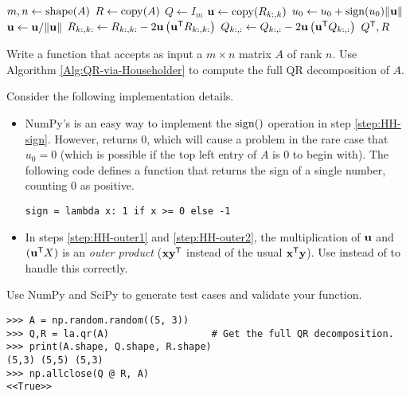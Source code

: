 \begin{algorithm}[H] %
\begin{algorithmic}[1]
    \State $m, n \gets \mathrm{shape}(A)$
    \State $R \gets \mathrm{copy}(A)$
    \State $Q \gets I_{m}$
        \State $\mathbf{u} \gets \mathrm{copy}(R_{k:,k})$
        \State $u_0 \gets u_0 + \operatorname{sign}(u_0)\|\mathbf{u}\|$
            \label{step:HH-sign}
        \State $\mathbf{u} \gets \mathbf{u}/\|\mathbf{u}\|$
        \State $R_{k:,k:} \gets R_{k:,k:} - 2\mathbf{u}\left(\mathbf{u}^{\mathsf T} R_{k:,k:}\right)$
            \label{step:HH-outer1}
        \State $Q_{k:,:} \gets Q_{k:,:} - 2\mathbf{u}\left(\mathbf{u}^{\mathsf T} Q_{k:,:}\right)$
            \label{step:HH-outer2}
    \EndFor
    \State {} $Q^{\mathsf T}, R$
\EndProcedure
\end{algorithmic}
\caption{}
\label{Alg:QR-via-Householder}
\end{algorithm}

\begin{problem} %
Write a function that accepts as input a $m \times n$ matrix $A$ of rank $n$.
Use Algorithm \ref{Alg:QR-via-Householder} to compute the full QR decomposition of $A$.

Consider the following implementation details.
\begin{itemize}

\item NumPy's  is an easy way to implement the $\operatorname{sign}()$ operation in step \ref{step:HH-sign}.
However,  returns $0$, which will cause a problem in the rare case that $u_0 = 0$ (which is possible if the top left entry of $A$ is $0$ to begin with).
The following code defines a function that returns the sign of a single number, counting $0$ as positive.

\begin{lstlisting}
sign = lambda x: 1 if x >= 0 else -1
\end{lstlisting}

\item In steps \ref{step:HH-outer1} and \ref{step:HH-outer2}, the multiplication of $\mathbf{u}$ and $(\mathbf{u}^{\mathsf T} X)$ is an \emph{outer product} ($\mathbf{x}\mathbf{y}^{\mathsf T}$ instead of the usual $\mathbf{x}^{\mathsf T}\mathbf{y}$).
Use  instead of  to handle this correctly.

\end{itemize}

Use NumPy and SciPy to generate test cases and validate your function.

\begin{lstlisting}
>>> A = np.random.random((5, 3))
>>> Q,R = la.qr(A)                  # Get the full QR decomposition.
>>> print(A.shape, Q.shape, R.shape)
(5,3) (5,5) (5,3)
>>> np.allclose(Q @ R, A)
<<True>>
\end{lstlisting}
\label{prob:qr-via-hessenberg}
\end{problem}

